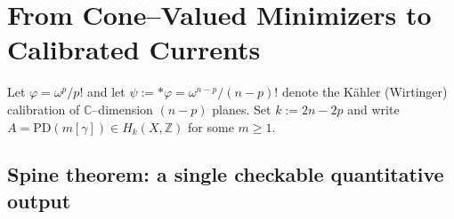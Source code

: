 \documentclass[11pt]{article}
\newcommand{\REVMZ}[1]{\textcolor{teal}{#1}}  %
\numberwithin{equation}{section}  %
\theoremstyle{plain}
\theoremstyle{definition}
\theoremstyle{remark}
\newcommand{\C}{\mathbb{C}}
\newcommand{\Z}{\mathbb{Z}}
\begin{document}
\section{From Cone--Valued Minimizers to Calibrated Currents}\label{sec:realization}

Let $\varphi=\omega^{p}/p!$ and let $\psi:=*\varphi=\omega^{n-p}/(n-p)!$ denote the
K\"ahler (Wirtinger) calibration \REVMZ{\cite{HL82}} of $\C$--dimension $(n-p)$ planes.  Set $k:=2n-2p$ and write $A=\mathrm{PD}(m[\gamma])\in H_{k}(X,\Z)$ for some $m\ge 1$.


\subsection*{Spine theorem: a single checkable quantitative output}
\end{document}
